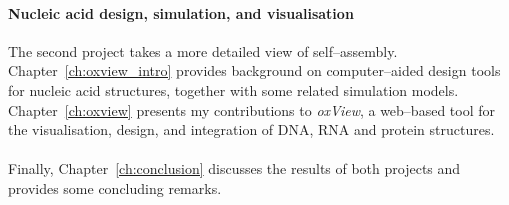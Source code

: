 \paragraph{Nucleic acid design, simulation, and visualisation}
The second project takes a more detailed view of self--assembly. Chapter~\ref{ch:oxview_intro} provides background on computer--aided design tools for nucleic acid structures, together with some related simulation models. Chapter~\ref{ch:oxview} presents my contributions to \emph{oxView}, a web--based tool for the visualisation, design, and integration of DNA, RNA and protein structures.

\paragraph{}
Finally, Chapter~\ref{ch:conclusion} discusses the results of both projects and provides some concluding remarks.



